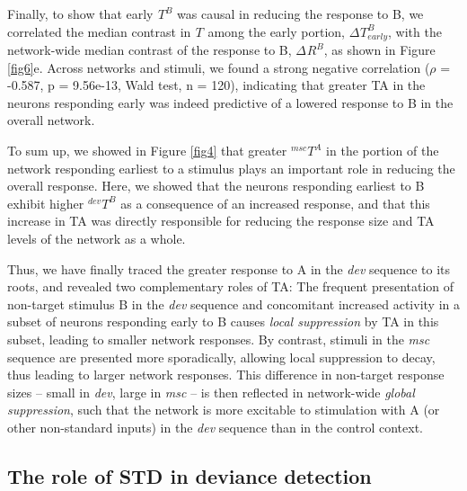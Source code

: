 \documentclass[pdflatex,referee,iicol,sn-basic]{sn-jnl}
\newcommand{\dev}{\textit{dev}}
\newcommand{\msc}{\textit{msc}}
\renewcommand{\R}[3][]{{}^{#1}_{}\!R^{#2}_{#3}}
\renewcommand{\T}[3][]{{}^{#1}_{}T^{#2}_{#3}}
\theoremstyle{thmstyleone}%
\theoremstyle{thmstyletwo}%
\theoremstyle{thmstylethree}%
\begin{document}
Finally, to show that early $\T{B}{}$ was causal in reducing the response to B, we correlated the median contrast in $\T{}{}$ among the early portion, $\Delta \T{B}{early}$, with the network-wide median contrast of the response to B, $\Delta \R{B}{}$, as shown in Figure \ref{fig6}e. Across networks and stimuli, we found a strong negative correlation ($\rho$ = -0.587, p = 9.56e-13, Wald test, n = 120), indicating that greater TA in the neurons responding early was indeed predictive of a lowered response to B in the overall network.

To sum up, we showed in Figure \ref{fig4} that greater $\T[msc]{A}{}$ in the portion of the network responding earliest to a stimulus plays an important role in reducing the overall response. Here, we showed that the neurons responding earliest to B exhibit higher $\T[dev]{B}{}$ as a consequence of an increased response, and that this increase in TA was directly responsible for reducing the response size and TA levels of the network as a whole.

Thus, we have finally traced the greater response to A in the \dev{} sequence to its roots, and revealed two complementary roles of TA: The frequent presentation of non-target stimulus B in the \dev{} sequence and concomitant increased activity in a subset of neurons responding early to B causes \emph{local suppression} by TA in this subset, leading to smaller network responses. By contrast, stimuli in the \msc{} sequence are presented more sporadically, allowing local suppression to decay, thus leading to larger network responses. This difference in non-target response sizes -- small in \dev{}, large in \msc{} -- is then reflected in network-wide \emph{global suppression}, such that the network is more excitable to stimulation with A (or other non-standard inputs) in the \dev{} sequence than in the control context.

\subsection{The role of STD in deviance detection}\label{sec-std}
\end{document}
